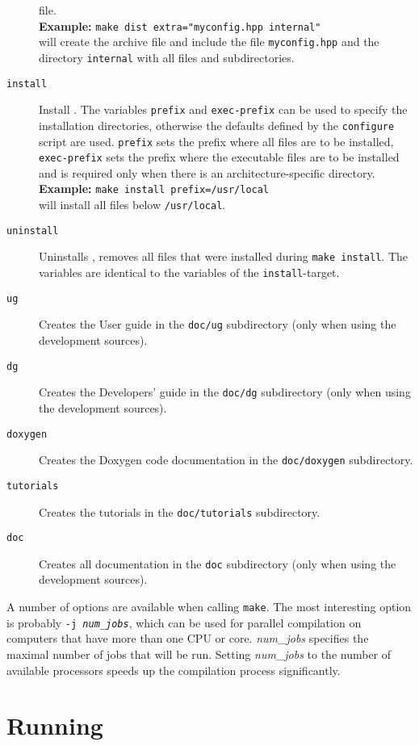 \begin{description}
  file. \\
  \textbf{Example:} \verb!make dist extra="myconfig.hpp internal"!\\
  will create the archive file and include the file
  \texttt{myconfig.hpp} and the directory \texttt{internal} with all
  files and subdirectories.
\item[\texttt{install}] Install \es. The variables \texttt{prefix} and
  \texttt{exec-prefix} can be used to specify the installation
  directories, otherwise the defaults defined by the
  \texttt{configure} script are used. \texttt{prefix} sets the prefix
  where all \es files are to be installed, \texttt{exec-prefix} sets
  the prefix where the executable files are to be installed and is
  required only when there is an architecture-specific directory.\\
  \textbf{Example:} \verb!make install prefix=/usr/local!\\
  will install all files below \texttt{/usr/local}.
\item[\texttt{uninstall}] Uninstalls \es, \ie removes all files that
  were installed during \texttt{make install}. The variables are
  identical to the variables of the \texttt{install}-target.
\item[\texttt{ug\ \ }] Creates the User guide in the \texttt{doc/ug}
  subdirectory (only when using the development sources).
\item[\texttt{dg\ \ }] Creates the Developers' guide in the
  \texttt{doc/dg} subdirectory (only when using the development
  sources).
\item[\texttt{doxygen\ \ }] Creates the Doxygen code documentation in the
  \texttt{doc/doxygen} subdirectory.
\item[\texttt{tutorials\ \ }] Creates the \es tutorials in the
  \texttt{doc/tutorials} subdirectory.
\item[\texttt{doc\ }] Creates all documentation in the \texttt{doc}
  subdirectory (only when using the development sources).
\end{description}

A number of options are available when calling \texttt{make}.  The
most interesting option is probably \texttt{-j \textit{num\_jobs}},
which can be used for parallel compilation on computers that have more
than one CPU or core.  \textit{num\_jobs} specifies the maximal number
of jobs that will be run.  Setting \textit{num\_jobs} to the number of
available processors speeds up the compilation process significantly.

\section{Running \es}
\label{sec:run}

